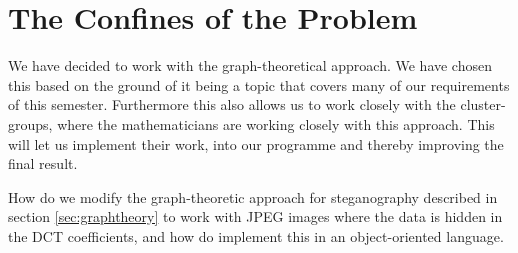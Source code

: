 \section{The Confines of the Problem}
We have decided to work with the graph-theoretical approach. 
We have chosen this based on the ground of it being a topic that covers many of our requirements of this semester. 
Furthermore this also allows us to work closely with the cluster-groups, where the mathematicians are working closely with this approach. 
This will let us implement their work, into our programme and thereby improving the final result.

\vspace{5mm}
\begin{centering}
	\begin{tcolorbox}[center title, title=Problem Statement, width=.7\textwidth]
		How do we modify the graph-theoretic approach for steganography described in section \ref{sec:graphtheory} to work with JPEG images where the data is hidden in the DCT coefficients, and how do implement this in an object-oriented language.  
	\end{tcolorbox}
\end{centering}